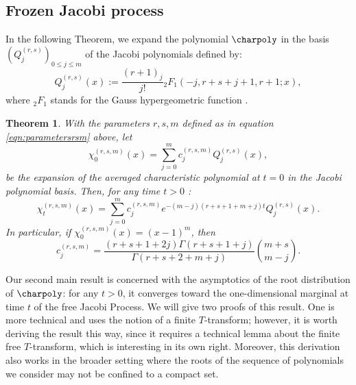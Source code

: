 \documentclass[12pt,reqno]{amsart}
\newtheorem{theorem}{Theorem}
\begin{document}
\subsection{Frozen Jacobi process}
In the following Theorem, we expand the polynomial $\charpoly$ in the basis $(Q_j^{(r,s)})_{0\leq j \leq m}$ of the Jacobi polynomials defined by:
\begin{equation*}
	Q_j^{(r,s)}(x) := \frac{(r+1)_j}{j!}{}_2F_1(-j, r+s+j+1, r+1; x),
\end{equation*}
where ${}_2F_1$ stands for the Gauss hypergeometric function \cite[Chapter 4]{duverney2024introduction}. 

\begin{theorem}
	\label{cor:expressionaveragedcharacteristic}
	With the parameters $r,s,m$ defined as in equation \eqref{eqn:parametersrsm} above, let
	\begin{equation*}
		\chi_0^{(r,s,m)}(x) = \sum_{j=0}^m c_j^{(r,s,m)} Q_j^{(r,s)}(x),
	\end{equation*}
	be the expansion of the averaged characteristic polynomial at $t=0$ in the Jacobi polynomial basis. Then, for any time $t > 0$ :
	\begin{equation*}
		\chi_t^{(r,s,m)}(x) = \sum_{j=0}^m c_j^{(r,s,m)} e^{-(m-j)(r+s+1+m+j)t}Q_j^{(r,s)}(x).   \end{equation*}
	In particular, if $\chi_0^{(r,s,m)}(x) = (x-1)^m$, then
	\begin{equation*}
		c_j^{(r,s,m)} =  \frac{(r+s+1+2j)\Gamma(r+s+1+j)}{\Gamma(r+s+2+m+j)} \binom{m+s}{m-j}.
	\end{equation*}
\end{theorem}

Our second main result is concerned with the asymptotics of the root distribution of $\charpoly$: for any $t > 0$, it converges toward the one-dimensional marginal at time $t$ of the free Jacobi Process. We will give two proofs of this result. One is more technical and uses the notion of a finite $T$-transform; however, it is worth deriving the result this way, since it requires a technical lemma about the finite free $T$-transform, which is interesting in its own right. Moreover, this derivation also works in the broader setting where the roots of the sequence of polynomials we consider may not be confined to a compact set. 
\end{document}

